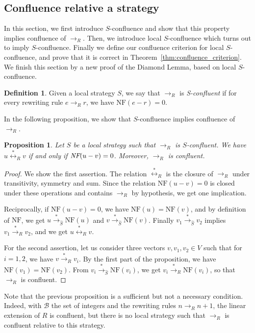 \documentclass[10pt]{easychair}
\newtheorem{proposition}[theorem]{Proposition}
\theoremstyle{definition}
\newtheorem{definition}[theorem]{Definition}
\newcommand\basis{\mathscr{B}}
\newcommand\rewR{\to_R}
\newcommand\transR{\overset{*}{\to}_R}
\newcommand\transS{\overset{*}{\to}_{\hat{S}}}
\newcommand\equivR{\overset{*}{\leftrightarrow}_R}
\newcommand\NF{\text{NF}}
\newcommand\NFF{\emph{NF}}
\begin{document}
\subsection{Confluence relative a strategy}
\label{sec:confluence_relative_a_strategy}

In this section, we first introduce $S$-confluence and show that this
property implies confluence of $\rewR$. Then, we introduce local
$S$-confluence which turns out to imply $S$-confluence. Finally we define our confluence
criterion for local $S$-confluence, and prove that it is correct in
Theorem~\ref{thm:confluence_criterion}. We finish this section by a new
proof of the Diamond Lemma, based on local $S$-confluence.
\smallskip

\begin{definition}\label{def:standardisation_property}
  Given a local strategy $S$, we say that $\rewR$ is \emph{S-confluent}
  if for every rewriting rule $e\rewR r$, we have $\NF(e-r)=0$.
\end{definition}
\smallskip

In the following proposition, we show that $S$-confluence implies
confluence of $\rewR$.
\medskip

\begin{proposition}\label{prop:h_and_R_confluence}
  Let $S$ be a local strategy such that $\rewR$ is $S$-confluent. We have
  $u\equivR v$ if and only if $\NFF(u-v)=0$. Moreover, $\rewR$ is
  confluent.
\end{proposition}

\begin{proof}
  We show the first assertion. The relation $\equivR$ is the closure of
  $\rewR$ under transitivity, symmetry and sum. Since the relation
  $\NF(u-v)=0$ is closed under these operations and contains $\rewR$ by hypothesis,
  we get one implication.
  
  Reciprocally, if $\NF(u-v)=0$, we have $\NF(u)=\NF(v)$, and by
  definition of $\NF$, we get $u\transS\NF(u)$ and $v\transS\NF(v)$. Finally
  $v_1\transS v_2$ implies $v_1\transR v_2$, and we get $u\equivR v$.

  For the second assertion, let us consider three vectors
  $v,v_1,v_2\in V$ such that for $i=1,2$, we have $v\transR v_i$. By the first
  part of the proposition, we have $\NF(v_1)=\NF(v_2)$. From
  $v_i\transS\NF(v_i)$, we get $v_i\transR\NF(v_i)$, so that $\rewR$ is
  confluent.
\end{proof}
\smallskip

Note that the previous proposition is a sufficient but not a necessary
condition. Indeed, with $\basis$ the set of integers and the rewriting
rules $n\rewR n+1$, the linear extension of $R$ is confluent, but there
is no local strategy such that $\rewR$ is confluent relative to this
strategy.
\smallskip
\end{document}
